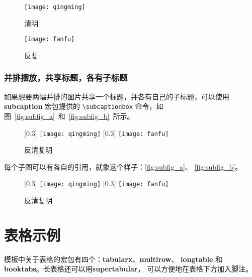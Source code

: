 \begin{figure}[htbp]
\centering
\begin{minipage}[t]{0.3\textwidth}
    \centering
    \texttt{[image: qingming]}
    \caption{清明}
    \label{fig:qingming}
\end{minipage}
\hspace{36pt}
\begin{minipage}[t]{0.3\textwidth}
    \centering
    \texttt{[image: fanfu]}
    \caption{反复}
    \label{fig:fanfu}
\end{minipage}
\end{figure}

\subsubsection*{并排摆放，共享标题，各有子标题}

如果想要两幅并排的图片共享一个标题，并各有自己的子标题，可以使用
\textbf{subcaption} 宏包提供的 \verb|\subcaptionbox| 命令，如图~\ref{fig:subfig_a}~和~\ref{fig:subfig_b}~所示。

\begin{code}
  \begin{figure}[htbp]
    \centering
    [0.3\textwidth]{
        \texttt{[image: qingming]}
    }
    \hspace{36pt}
    [0.3\textwidth]{
        \texttt{[image: fanfu]}
    }
    \caption{反清复明}
  \end{figure}
\end{code}

每个子图可以有各自的引用，就象这个样子：\ref{fig:subfig_a}、
\ref{fig:subfig_b}。

\begin{figure}[htbp]
\centering
{}[0.3\textwidth]{
    \texttt{[image: qingming]}
}
\hspace{36pt}
[0.3\textwidth]{
    \texttt{[image: fanfu]}
}
\caption{反清复明}
\end{figure}

\section{表格示例}
\label{sec:table}

模板中关于表格的宏包有四个：\textbf{tabularx}、\textbf{multirow}、
\textbf{longtable} 和\textbf{booktabs}。长表格还可以用\textbf{supertabular}，
可以方便地在表格下方加入脚注。

